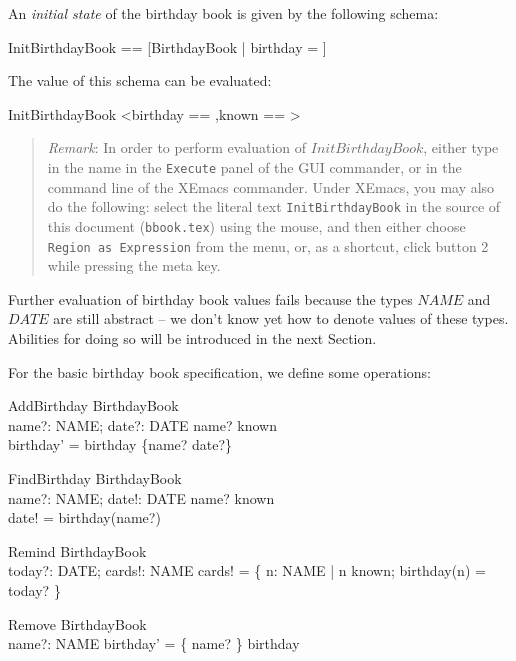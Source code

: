 \documentclass{article}
\newenvironment{remark}
{\begin{small}\begin{quote}\emph{Remark}: }{\end{quote}\end{small}}
\begin{document}
An \emph{initial state} of the birthday book is given by the following
schema:

\begin{axdef}
 InitBirthdayBook == [BirthdayBook | birthday = \emptyset] 
\end{axdef}

The value of this schema can be evaluated:

\begin{zexecexpr}
 InitBirthdayBook
\yields
 {<birthday == {},known == {}>}
\end{zexecexpr}

\begin{remark}
  In order to perform evaluation of $InitBirthdayBook$, either type in
  the name in the \texttt{Execute} panel of the GUI commander, or in
  the command line of the XEmacs commander. Under XEmacs, you may also
  do the following: select the literal text \texttt{InitBirthdayBook}
  in the source of this document (\texttt{bbook.tex}) using the mouse,
  and then either choose \texttt{Region as Expression} from the
  \Zeta{} menu, or, as a shortcut, click button 2 while pressing the
  meta key.
\end{remark}

Further evaluation of birthday book values fails because the types
$NAME$ and $DATE$ are still abstract -- we don't know yet how
to denote values of these types. Abilities for doing so will be
introduced in the next Section.

For the basic birthday book specification, we define some operations:

\begin{zedgroup}
\begin{schema}{AddBirthday}
  \Delta BirthdayBook \\
  name?: NAME; date?: DATE
\where
  name? \notin known \\
  birthday' = birthday \cup \{name? \mapsto date?\}
\end{schema}
\begin{schema}{FindBirthday}
  \Xi BirthdayBook \\
  name?: NAME; date!: DATE 
\where
  name? \in known \\
  date! = birthday(name?)
\end{schema}
\begin{schema}{Remind}
  \Xi BirthdayBook \\
  today?: DATE; cards!: \power NAME
\where
  cards! = \{ n: NAME | n \in known; birthday(n) =   today? \}\\
\end{schema}
\begin{schema}{Remove}
  \Delta  BirthdayBook \\
  name?:  NAME
\where
  birthday' = \{ name?  \} \ndres birthday\\
\end{schema}
\end{zedgroup}
\end{document}
